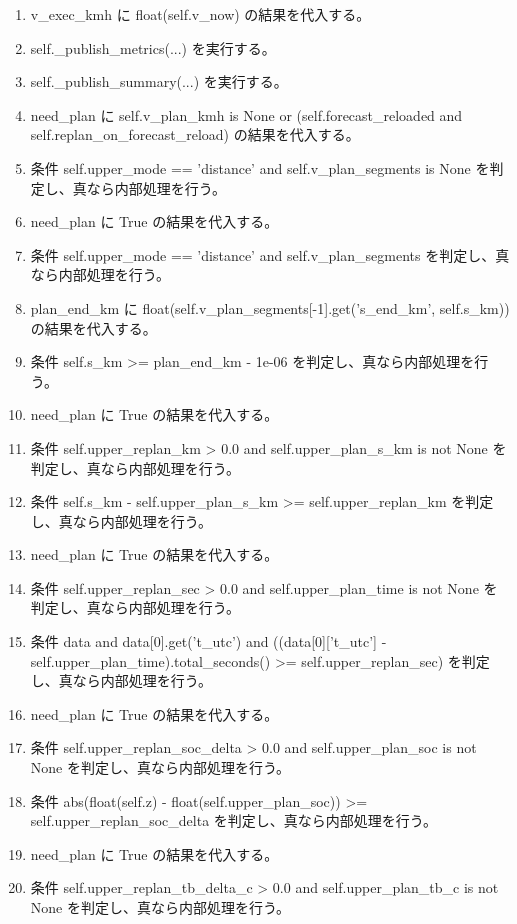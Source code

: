 \documentclass[a4paper,11pt]{article}
\begin{document}
\begin{enumerate}[leftmargin=1.8em]
\item     v\_exec\_kmh に float(self.v\_now) の結果を代入する。
\item   self.\_publish\_metrics(...) を実行する。
\item   self.\_publish\_summary(...) を実行する。
\item need\_plan に self.v\_plan\_kmh is None or (self.forecast\_reloaded and self.replan\_on\_forecast\_reload) の結果を代入する。
\item 条件 self.upper\_mode == 'distance' and self.v\_plan\_segments is None を判定し、真なら内部処理を行う。
\item   need\_plan に True の結果を代入する。
\item 条件 self.upper\_mode == 'distance' and self.v\_plan\_segments を判定し、真なら内部処理を行う。
\item   plan\_end\_km に float(self.v\_plan\_segments[-1].get('s\_end\_km', self.s\_km)) の結果を代入する。
\item   条件 self.s\_km >= plan\_end\_km - 1e-06 を判定し、真なら内部処理を行う。
\item     need\_plan に True の結果を代入する。
\item 条件 self.upper\_replan\_km > 0.0 and self.upper\_plan\_s\_km is not None を判定し、真なら内部処理を行う。
\item   条件 self.s\_km - self.upper\_plan\_s\_km >= self.upper\_replan\_km を判定し、真なら内部処理を行う。
\item     need\_plan に True の結果を代入する。
\item 条件 self.upper\_replan\_sec > 0.0 and self.upper\_plan\_time is not None を判定し、真なら内部処理を行う。
\item   条件 data and data[0].get('t\_utc') and ((data[0]['t\_utc'] - self.upper\_plan\_time).total\_seconds() >= self.upper\_replan\_sec) を判定し、真なら内部処理を行う。
\item     need\_plan に True の結果を代入する。
\item 条件 self.upper\_replan\_soc\_delta > 0.0 and self.upper\_plan\_soc is not None を判定し、真なら内部処理を行う。
\item   条件 abs(float(self.z) - float(self.upper\_plan\_soc)) >= self.upper\_replan\_soc\_delta を判定し、真なら内部処理を行う。
\item     need\_plan に True の結果を代入する。
\item 条件 self.upper\_replan\_tb\_delta\_c > 0.0 and self.upper\_plan\_tb\_c is not None を判定し、真なら内部処理を行う。

\end{enumerate}
\end{document}
